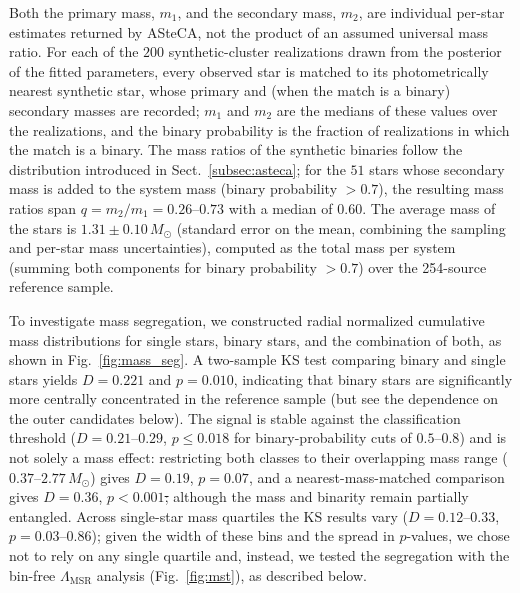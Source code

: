\documentclass{aa}
\providecommand{\DIFaddtex}[1]{{\protect\color{red}\uwave{#1}}} %
\providecommand{\DIFdeltex}[1]{{\protect\color{red}\sout{#1}}} %
\providecommand{\DIFaddbegin}{} %
\providecommand{\DIFaddend}{} %
\providecommand{\DIFdelbegin}{} %
\providecommand{\DIFdelend}{} %
\providecommand{\DIFadd}[1]{\texorpdfstring{\DIFaddtex{#1}}{#1}} %
\providecommand{\DIFdel}[1]{\texorpdfstring{\DIFdeltex{#1}}{}} %
\providecommand{\DIFscaledelfig}{0.5}
\newlength{\DIFdelgraphicswidth} %
\newlength{\DIFdelgraphicsheight} %
\providecommand{\DIFaddincludegraphics}[2][]{{\color{blue}\fbox{\DIFOincludegraphics[#1]{#2}}}} %
\providecommand{\DIFdelincludegraphics}[2][]{%
\sbox{\DIFdelgraphicsbox}{\DIFOincludegraphics[#1]{#2}}%
\settoboxwidth{\DIFdelgraphicswidth}{\DIFdelgraphicsbox} %
\settoboxtotalheight{\DIFdelgraphicsheight}{\DIFdelgraphicsbox} %
\scalebox{\DIFscaledelfig}{%
\parbox[b]{\DIFdelgraphicswidth}{\usebox{\DIFdelgraphicsbox}\\[-\baselineskip] \rule{\DIFdelgraphicswidth}{0em}}\llap{\resizebox{\DIFdelgraphicswidth}{\DIFdelgraphicsheight}{%
\setlength{\unitlength}{\DIFdelgraphicswidth}%
\begin{picture}(1,1)%
\thicklines\linethickness{2pt} %
{\color[rgb]{1,0,0}\put(0,0){\framebox(1,1){}}}%
{\color[rgb]{1,0,0}\put(0,0){\line( 1,1){1}}}%
{\color[rgb]{1,0,0}\put(0,1){\line(1,-1){1}}}%
\end{picture}%
}\hspace*{3pt}}} %
} %
\DeclareRobustCommand{\DIFaddbegin}{\DIFOaddbegin \let\includegraphics\DIFaddincludegraphics} %
\DeclareRobustCommand{\DIFaddend}{\DIFOaddend \let\includegraphics\DIFOincludegraphics} %
\DeclareRobustCommand{\DIFdelbegin}{\DIFOdelbegin \let\includegraphics\DIFdelincludegraphics} %
\DeclareRobustCommand{\DIFdelend}{\DIFOaddend \let\includegraphics\DIFOincludegraphics} %
\begin{document}
Both the primary mass, $m_1$, and the secondary mass, $m_2$, are individual per-star estimates returned by ASteCA, not the product of an assumed universal mass ratio. For each of the $200$ synthetic-cluster realizations drawn from the posterior of the fitted parameters, every observed star is matched to its photometrically nearest synthetic star, whose primary and (when the match is a binary) secondary masses are recorded; $m_1$ and $m_2$ are the medians of these values over the realizations, and the binary probability is the fraction of realizations in which the match is a binary. The mass ratios of the synthetic binaries follow the \citet{2013ARA&A..51..269D} distribution introduced in Sect.~\ref{subsec:asteca}; for the $51$ stars whose secondary mass is added to the system mass (binary probability $>0.7$), the resulting mass ratios span $q=m_2/m_1=0.26$--$0.73$ with a median of $0.60$. The average mass of the stars is $1.31 \pm 0.10\,M_\odot$ (standard error on the mean, combining the sampling and per-star mass uncertainties), computed as the total mass per system (summing both components for binary probability $>0.7$) over the 254-source reference sample.

To investigate mass segregation, we constructed radial normalized cumulative mass distributions for single stars, binary stars, and the combination of both, as shown in Fig.~\ref{fig:mass_seg}. A two-sample KS test comparing binary and single stars yields $D=0.221$ and $p=0.010$, indicating that binary stars are significantly more centrally concentrated in the reference sample (but see the dependence on the outer candidates below). The signal is stable against the classification threshold ($D=0.21$--$0.29$, $p\leq0.018$ for binary-probability cuts of $0.5$--$0.8$) and is not solely a mass effect: restricting both classes to their overlapping mass range ($0.37$--$2.77\,M_\odot$) gives $D=0.19$, $p=0.07$, and a nearest-mass-matched comparison gives $D=0.36$, $p<0.001$\DIFdelbegin \DIFdel{; }\DIFdelend \DIFaddbegin \DIFadd{, }\DIFaddend although the mass and binarity remain partially entangled. Across single-star mass quartiles the KS results vary ($D=0.12$--$0.33$, $p=0.03$--$0.86$); given the width of these bins and the spread in $p$-values, we chose not to rely on any single quartile and, instead, we tested the segregation with the bin-free $\Lambda_{\mathrm{MSR}}$ analysis (Fig.~\ref{fig:mst}), as described below.
\end{document}

